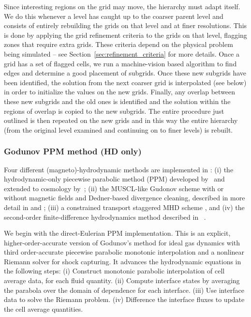 Since interesting regions on the grid may move, the hierarchy must
adapt itself.  We do this whenever a level has caught up to the
coarser parent level and consists of entirely rebuilding the grids
on that level and at finer resolutions.  This is done by applying the grid refinement
criteria to the grids on that level, flagging zones that require
extra grids.  These criteria depend on the physical problem being
simulated -- see Section~\ref{sec:refinement_criteria} for more details.  Once a grid has a set of flagged cells,
we run a machine-vision based algorithm \citep{Berger91} to find edges
and determine a good placement of subgrids. 
Once these new subgrids have been identified, the
solution from the next coarser grid is interpolated (see below) in
order to initialize the values on the new grids.  Finally, any overlap
between these new subgrids and the old ones is identified and the
solution within the regions of overlap is copied to the new subgrids.
The entire procedure just outlined is then repeated on the new grids
and in this way the entire hierarchy (from the original level examined
and continuing on to finer levels) is rebuilt.

\subsubsection{Godunov PPM method (HD only)}

Four different (magneto)-hydrodynamic methods are implemented in
\enzo: (i) the hydrodynamic-only piecewise parabolic method (PPM)
developed by~\citet{1984JCoPh..54..174C} and extended to cosmology
by~\citet{1995CoPhC..89..149B}; (ii) the MUSCL-like Gudonov scheme
\citep{MUSCL} with or without magnetic fields and Dedner-based
divergence cleaning, described in more detail in
\citet{WangAbelZhang08} and \citet{WangAbel09}; (iii) a constrained
transport staggered MHD scheme \citep{Collins10}, and (iv) the
second-order finite-difference hydrodynamics method described in
\zeus~\citep{Stone92a,Stone92b}.

We begin with the direct-Eulerian PPM implementation.  This is an
explicit, higher-order-accurate version of Godunov's method for ideal
gas dynamics with third order-accurate piecewise parabolic monotonic
interpolation and a nonlinear Riemann solver for shock capturing.  It
advances the hydrodynamic equations in the following steps:
 (i) Construct monotonic parabolic interpolation of cell average data, for each fluid quantity.
(ii) Compute interface states by averaging the parabola over the domain of dependence for each interface.
(iii) Use interface data to solve the Riemann problem.
 (iv) Difference the interface fluxes to update the cell average quantities.

